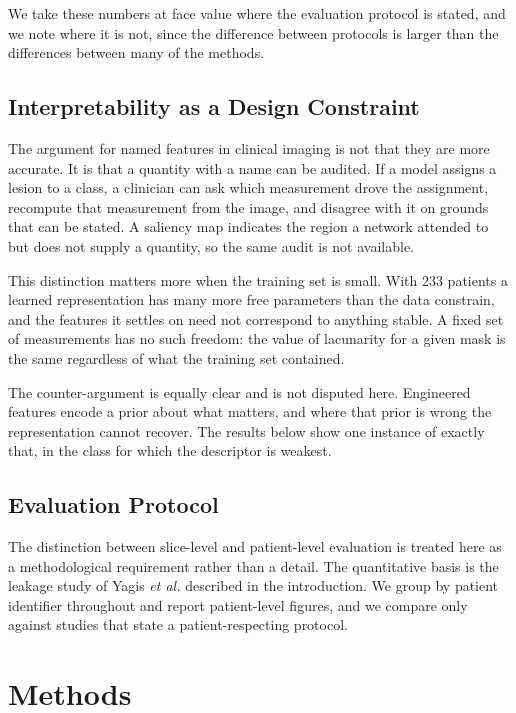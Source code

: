 \documentclass[journal]{IEEEtran}
\begin{document}
We take these numbers at face value where the evaluation protocol is stated, and
we note where it is not, since the difference between protocols is larger than
the differences between many of the methods.

\subsection{Interpretability as a Design Constraint}
The argument for named features in clinical imaging is not that they are more
accurate. It is that a quantity with a name can be audited. If a model assigns a
lesion to a class, a clinician can ask which measurement drove the assignment,
recompute that measurement from the image, and disagree with it on grounds that
can be stated. A saliency map indicates the region a network attended to but does
not supply a quantity, so the same audit is not available.

This distinction matters more when the training set is small. With $233$ patients
a learned representation has many more free parameters than the data constrain,
and the features it settles on need not correspond to anything stable. A fixed
set of measurements has no such freedom: the value of lacunarity for a given mask
is the same regardless of what the training set contained.

The counter-argument is equally clear and is not disputed here. Engineered
features encode a prior about what matters, and where that prior is wrong the
representation cannot recover. The results below show one instance of exactly
that, in the class for which the descriptor is weakest.

\subsection{Evaluation Protocol}
The distinction between slice-level and patient-level evaluation is treated here
as a methodological requirement rather than a detail. The quantitative basis is
the leakage study of Yagis \emph{et al.} \cite{yagis2021} described in the
introduction. We group by patient identifier throughout and report patient-level
figures, and we compare only against studies that state a patient-respecting
protocol.

\section{Methods}
\end{document}
